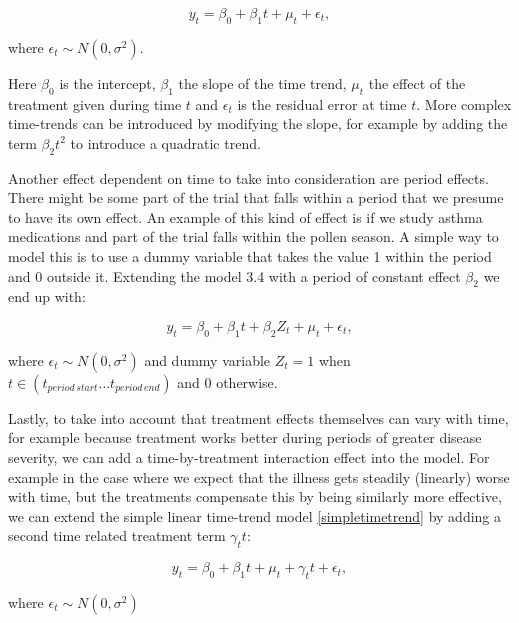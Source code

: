 \documentclass[12pt,a4paper,leqno]{report}
\theoremstyle{plain}
\theoremstyle{definition}
\theoremstyle{remark}
\begin{document}
\begin{def}\label{}
    \begin{equation}\label{simpletimetrend}
        y_t = \beta_0 + \beta_1 t + \mu_t + \epsilon_t,
    \end{equation}
\end{def}where \(\epsilon_t \sim N(0,\sigma^2)\).

Here \(\beta_0\) is the intercept, \(\beta_1\) the slope of the time trend, \(\mu_t\) the
effect of the treatment given during time \(t\) and \(\epsilon_t\) is the residual error
at time \(t\). More complex time-trends can be introduced by modifying the slope, for
example by adding the term \(\beta_2 t^2\) to introduce a quadratic trend.

Another effect dependent on time to take into consideration are period effects. There
might be some part of the trial that falls within a period that we presume to have its
own effect. An example of this kind of effect is if we study asthma medications and part
of the trial falls within the pollen season. A simple way to model this is to use a dummy
variable that takes the value 1 within the period and 0 outside it. Extending the model
3.4 with a period of constant effect \(\beta_2\) we end up with:

\begin{def}\label{}
    \begin{equation}\label{}
        y_t = \beta_0 + \beta_1 t + \beta_{2}Z_t + \mu_t + \epsilon_t,
    \end{equation}
\end{def}where \(\epsilon_t \sim N(0,\sigma^2)\) and dummy variable \(Z_t = 1\) when \(t
\in (t_{period\,start} \ldots t_{period\,end}) \) and \(0\) otherwise.

Lastly, to take into account that treatment effects themselves can vary with time, for
example because treatment works better during periods of greater disease severity, we can
add a time-by-treatment interaction effect into the model. For example in the case where
we expect that the illness gets steadily (linearly) worse with time, but the treatments
compensate this by being similarly more effective, we can extend the simple linear
time-trend model \ref{simpletimetrend} by adding a second time related treatment term
\(\gamma_t t\):

\begin{def}\label{}
    \begin{equation}\label{}
        y_t = \beta_0 + \beta_1 t + \mu_t + \gamma_t t + \epsilon_t,
    \end{equation}
\end{def}where \(\epsilon_t \sim N(0,\sigma^2)\)
\end{document}
